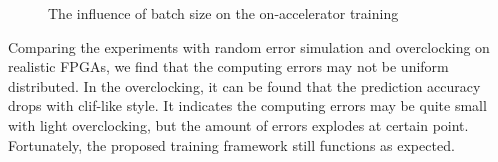 \begin{figure}
        \caption{The influence of batch size on the on-accelerator training}
        \label{fig:batch}
\end{figure}

Comparing the experiments with random error simulation and overclocking on realistic FPGAs, we
find that the computing errors may not be uniform distributed. In the overclocking, it can be found 
that the prediction accuracy drops with clif-like style. It indicates the computing errors may 
be quite small with light overclocking, but the amount of errors explodes at certain point.
Fortunately, the proposed training framework still functions as expected.

